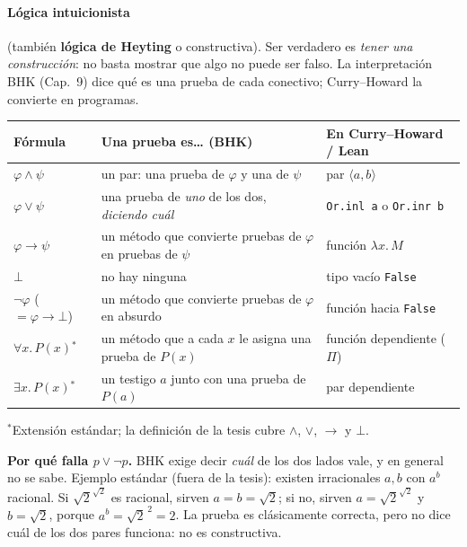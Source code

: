 \documentclass[11pt,a4paper]{article}
\newcommand{\termino}[1]{\textbf{#1}}
\begin{document}
\paragraph{Lógica intuicionista} (también \termino{lógica de Heyting} o
constructiva). Ser verdadero es \emph{tener una construcción}: no basta mostrar
que algo no puede ser falso. La interpretación BHK (Cap.\ 9) dice qué es una
prueba de cada conectivo; Curry--Howard la convierte en programas.

\begin{center}
\renewcommand{\arraystretch}{1.25}
{\small
\begin{tabular}{@{}l >{\raggedright\arraybackslash}p{6.3cm} >{\raggedright\arraybackslash}p{4.6cm}@{}}
\toprule
\textbf{Fórmula} & \textbf{Una prueba es\dots{} (BHK)} & \textbf{En Curry--Howard / Lean}\\
\midrule
\(\varphi\wedge\psi\) & un par: una prueba de \(\varphi\) y una de \(\psi\) & par \(\langle a,b\rangle\)\\
\(\varphi\vee\psi\) & una prueba de \emph{uno} de los dos, \emph{diciendo cuál} & \texttt{Or.inl a} o \texttt{Or.inr b}\\
\(\varphi\to\psi\) & un método que convierte pruebas de \(\varphi\) en pruebas de \(\psi\) & función \(\lambda x.\,M\)\\
\(\bot\) & no hay ninguna & tipo vacío \texttt{False}\\
\(\neg\varphi\) (\(=\varphi\to\bot\)) & un método que convierte pruebas de \(\varphi\) en absurdo & función hacia \texttt{False}\\
\(\forall x.\,P(x)\)\(^{*}\) & un método que a cada \(x\) le asigna una prueba de \(P(x)\) & función dependiente (\(\Pi\))\\
\(\exists x.\,P(x)\)\(^{*}\) & un testigo \(a\) junto con una prueba de \(P(a)\) & par dependiente\\
\bottomrule
\end{tabular}}

{\footnotesize \(^{*}\)Extensión estándar; la definición de la tesis cubre \(\wedge\), \(\vee\), \(\to\) y \(\bot\).}
\end{center}

\textbf{Por qué falla \(p\vee\neg p\).} BHK exige decir \emph{cuál} de los dos
lados vale, y en general no se sabe. Ejemplo estándar (fuera de la tesis):
existen irracionales \(a,b\) con \(a^b\) racional. Si \(\sqrt2^{\sqrt2}\) es
racional, sirven \(a=b=\sqrt2\); si no, sirven \(a=\sqrt2^{\sqrt2}\) y
\(b=\sqrt2\), porque \(a^b=\sqrt2^{\,2}=2\). La prueba es clásicamente
correcta, pero no dice cuál de los dos pares funciona: no es constructiva.
\end{document}
